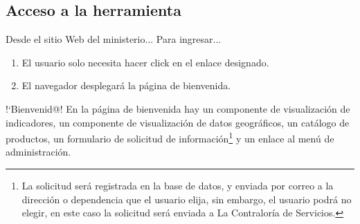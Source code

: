 \documentclass[xcolor=table, aspectratio=169]{beamer}
\begin{document}
\subsection{Acceso a la herramienta}

\begin{frame}[t]{Desde el sitio Web del ministerio...}
    Para ingresar...
    
	\begin{enumerate}
		\item El usuario solo necesita hacer click en el enlace designado.
		\item El navegador desplegar\'a la p\'agina de bienvenida.
	\end{enumerate}
		
	\begin{block}{!`Bienvenid@!}
		En la p\'agina de bienvenida hay un componente de visualizaci\'on de indicadores, un componente de visualizaci\'on de datos geogr\'aficos, un cat\'alogo de productos, un formulario de solicitud de informaci\'on\footnote{La solicitud ser\'a registrada en la base de datos, y enviada por correo a la direcci\'on o dependencia que el usuario elija, sin embargo, el usuario podr\'a no elegir, en este caso la solicitud ser\'a enviada a La Contralor\'ia de Servicios.} y un enlace al men\'u de administraci\'on.
	\end{block}
\end{frame}
\end{document}
